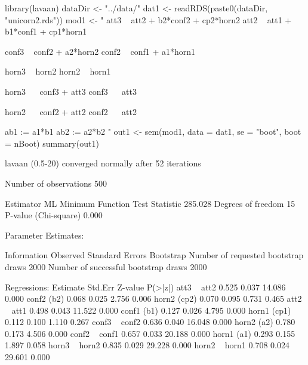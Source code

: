 \begin{Schunk}
\begin{Sinput}
 library(lavaan)
 dataDir <- "../data/"
 dat1 <- readRDS(paste0(dataDir, "unicorn2.rds"))
 mod1 <- "
 att3 ~ att2 + b2*conf2 + cp2*horn2
 att2 ~ att1 + b1*conf1 + cp1*horn1
 
 conf3 ~ conf2 + a2*horn2
 conf2 ~ conf1 + a1*horn1
 
 horn3 ~ horn2
 horn2 ~ horn1
 
 horn3 ~~ conf3 + att3
 conf3 ~~ att3
 
 horn2 ~~ conf2 + att2
 conf2 ~~ att2
 
 ab1 := a1*b1
 ab2 := a2*b2
 "
 out1 <- sem(mod1, data = dat1, se = "boot", boot = nBoot)
 summary(out1)
\end{Sinput}
\begin{Soutput}
lavaan (0.5-20) converged normally after  52 iterations

  Number of observations                           500

  Estimator                                         ML
  Minimum Function Test Statistic              285.028
  Degrees of freedom                                15
  P-value (Chi-square)                           0.000

Parameter Estimates:

  Information                                 Observed
  Standard Errors                            Bootstrap
  Number of requested bootstrap draws             2000
  Number of successful bootstrap draws            2000

Regressions:
                   Estimate  Std.Err  Z-value  P(>|z|)
  att3 ~                                              
    att2              0.525    0.037   14.086    0.000
    conf2     (b2)    0.068    0.025    2.756    0.006
    horn2    (cp2)    0.070    0.095    0.731    0.465
  att2 ~                                              
    att1              0.498    0.043   11.522    0.000
    conf1     (b1)    0.127    0.026    4.795    0.000
    horn1    (cp1)    0.112    0.100    1.110    0.267
  conf3 ~                                             
    conf2             0.636    0.040   16.048    0.000
    horn2     (a2)    0.780    0.173    4.506    0.000
  conf2 ~                                             
    conf1             0.657    0.033   20.188    0.000
    horn1     (a1)    0.293    0.155    1.897    0.058
  horn3 ~                                             
    horn2             0.835    0.029   29.228    0.000
  horn2 ~                                             
    horn1             0.708    0.024   29.601    0.000


\end{Soutput}
\end{Schunk}
